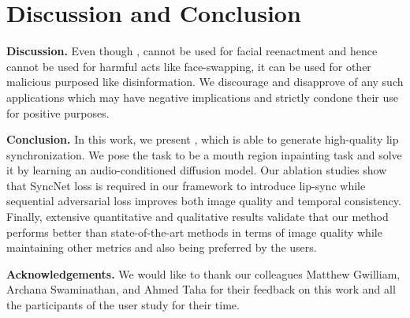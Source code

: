  
\section{Discussion and Conclusion}
 \vspace{-0.1in}
\noindent\textbf{Discussion.} 
Even though \ours, cannot be used for facial reenactment and hence cannot be used for harmful acts like face-swapping, it can be used for other malicious purposed like disinformation. We discourage and disapprove of any such applications which may have negative implications and strictly condone their use for positive purposes.    



\noindent\textbf{Conclusion.} In this work, we present \ours, which is able to generate high-quality lip synchronization. We pose the task to be a mouth region inpainting task and solve it by learning an audio-conditioned diffusion model. Our ablation studies show that SyncNet loss is required in our framework to introduce lip-sync while sequential adversarial loss improves both image quality and temporal consistency. Finally, extensive quantitative and qualitative results validate that our method performs better than state-of-the-art methods in terms of image quality while maintaining other metrics and also being preferred by the users. 


\noindent\textbf{Acknowledgements.} 
We would like to thank our colleagues 
Matthew Gwilliam, Archana Swaminathan, and Ahmed Taha for their feedback on this work and all the participants of the user study for their time.



